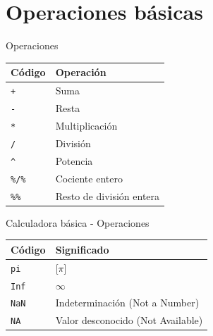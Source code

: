 \documentclass[
  ignorenonframetext,
  aspectratio=169]{beamer}
\begin{document}
\hypertarget{operaciones-buxe1sicas}{%
\section{Operaciones básicas}\label{operaciones-buxe1sicas}}

\begin{frame}[fragile]{Operaciones}
\protect\hypertarget{operaciones}{}
\begin{longtable}[]{@{}ll@{}}
\toprule()
Código & Operación \\
\midrule()
\endhead
\texttt{+} & Suma \\
\texttt{-} & Resta \\
\texttt{*} & Multiplicación \\
\texttt{/} & División \\
\texttt{\^{}} & Potencia \\
\texttt{\%/\%} & Cociente entero \\
\texttt{\%\%} & Resto de división entera \\
\bottomrule()
\end{longtable}
\end{frame}

\begin{frame}[fragile]{Calculadora básica - Operaciones}
\protect\hypertarget{calculadora-buxe1sica---operaciones}{}
\begin{longtable}[]{@{}ll@{}}
\toprule()
Código & Significado \\
\midrule()
\endhead
\texttt{pi} & {[}\(\pi\){]} \\
\texttt{Inf} &
\href{https://es.wikipedia.org/wiki/Infinito}{\(\infty\)} \\
\texttt{NaN} & Indeterminación (Not a Number) \\
\texttt{NA} & Valor desconocido (Not Available) \\
\bottomrule()
\end{longtable}
\end{frame}
\end{document}

